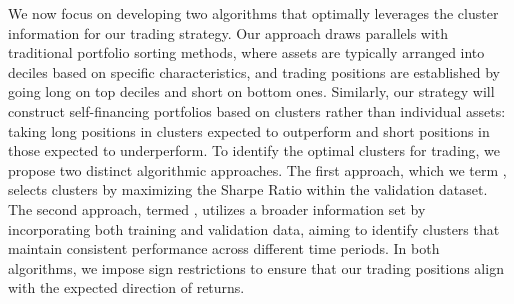 \mx
We now focus on developing two algorithms that optimally leverages the cluster information for our trading strategy. Our approach draws parallels with traditional portfolio sorting methods, where assets are typically arranged into deciles based on specific characteristics, and trading positions are established by going long on top deciles and short on bottom ones. Similarly, our strategy will construct self-financing portfolios based on clusters rather than individual assets: taking long positions in clusters expected to outperform and short positions in those expected to underperform.
%
To identify the optimal clusters for trading, we propose two distinct algorithmic approaches. The first approach, which we term , selects clusters by maximizing the Sharpe Ratio within the validation dataset. The second approach, termed , utilizes a broader information set by incorporating both training and validation data, aiming to identify clusters that maintain consistent performance across different time periods. In both algorithms, we impose sign restrictions to ensure that our trading positions align with the expected direction of returns.



